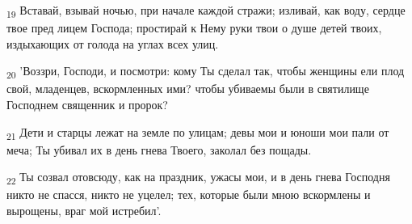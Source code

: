 \begin{tcolorbox}
\textsubscript{19} Вставай, взывай ночью, при начале каждой стражи; изливай, как воду, сердце твое пред лицем Господа; простирай к Нему руки твои о душе детей твоих, издыхающих от голода на углах всех улиц.
\end{tcolorbox}
\begin{tcolorbox}
\textsubscript{20} 'Воззри, Господи, и посмотри: кому Ты сделал так, чтобы женщины ели плод свой, младенцев, вскормленных ими? чтобы убиваемы были в святилище Господнем священник и пророк?
\end{tcolorbox}
\begin{tcolorbox}
\textsubscript{21} Дети и старцы лежат на земле по улицам; девы мои и юноши мои пали от меча; Ты убивал их в день гнева Твоего, заколал без пощады.
\end{tcolorbox}
\begin{tcolorbox}
\textsubscript{22} Ты созвал отовсюду, как на праздник, ужасы мои, и в день гнева Господня никто не спасся, никто не уцелел; тех, которые были мною вскормлены и вырощены, враг мой истребил'.
\end{tcolorbox}
